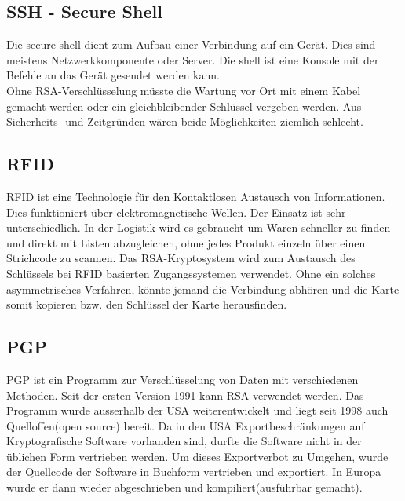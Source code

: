 \subsection{SSH - Secure Shell}
Die secure shell dient zum Aufbau einer Verbindung auf ein Gerät. Dies sind meistens Netzwerkkomponente oder Server. Die shell ist eine Konsole mit der Befehle an das Gerät gesendet werden kann.\\
Ohne RSA-Verschlüsselung müsste die Wartung vor Ort mit einem Kabel gemacht werden oder ein gleichbleibender Schlüssel vergeben werden. Aus Sicherheits- und Zeitgründen wären beide Möglichkeiten ziemlich schlecht.

\subsection{RFID}
RFID ist eine Technologie für den Kontaktlosen Austausch von Informationen. Dies funktioniert über elektromagnetische Wellen. Der Einsatz ist sehr unterschiedlich. In der Logistik wird es gebraucht um Waren schneller zu finden und direkt mit Listen abzugleichen, ohne jedes Produkt einzeln über einen Strichcode zu scannen. Das RSA-Kryptosystem wird zum Austausch des Schlüssels bei RFID basierten Zugangssystemen verwendet. Ohne ein solches asymmetrisches Verfahren, könnte jemand die Verbindung abhören und die Karte somit kopieren bzw. den Schlüssel der Karte herausfinden.

\subsection{PGP}
PGP ist ein Programm zur Verschlüsselung von Daten mit verschiedenen Methoden. Seit der ersten Version 1991 kann RSA verwendet werden. Das Programm wurde ausserhalb der USA weiterentwickelt und liegt seit 1998 auch Quelloffen(open source) bereit. Da in den USA Exportbeschränkungen auf Kryptografische Software vorhanden sind, durfte die Software nicht in der üblichen Form vertrieben werden. Um dieses Exportverbot zu Umgehen, wurde der Quellcode der Software in Buchform vertrieben und exportiert. In Europa wurde er dann wieder abgeschrieben und kompiliert(ausführbar gemacht). 

